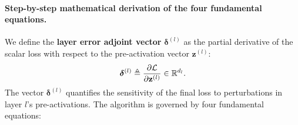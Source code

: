 \paragraph{Step-by-step mathematical derivation of the four fundamental equations.}
We define the \textbf{layer error adjoint vector} $\boldsymbol{\delta}^{(l)}$ as the partial derivative of the scalar loss with respect to the pre-activation vector $\mathbf{z}^{(l)}$:
\begin{equation}
\boldsymbol{\delta}^{(l)} \triangleq \frac{\partial \mathcal{L}}{\partial \mathbf{z}^{(l)}} \in \mathbb{R}^{d_l}.
\label{eq:delta_definition_ch4}
\end{equation}
The vector $\boldsymbol{\delta}^{(l)}$ quantifies the sensitivity of the final loss to perturbations in layer $l$'s pre-activations. The algorithm is governed by four fundamental equations:

